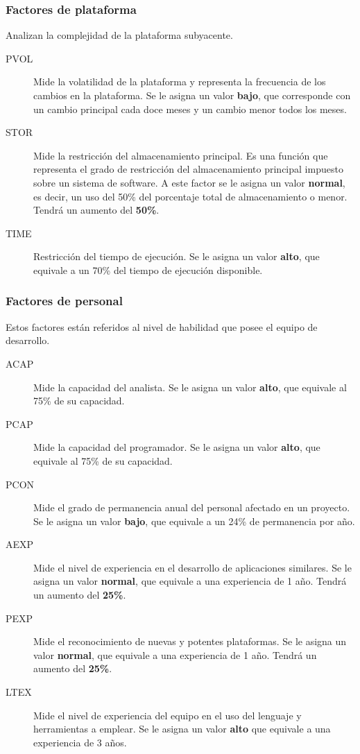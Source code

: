\documentclass[11pt,a4paper,spanish,twoside]{report}
\begin{document}
\subsubsection{Factores de plataforma}
Analizan la complejidad de la plataforma subyacente.
\begin{description}
\item[PVOL] Mide la volatilidad de la plataforma y representa la frecuencia de
  los cambios en la plataforma. Se le asigna un valor \textbf{bajo}, que
  corresponde con un cambio principal cada doce meses y un cambio menor todos
  los meses.

\item[STOR] Mide la restricción del almacenamiento principal. Es una función
  que representa el grado de restricción del almacenamiento principal
  impuesto sobre un sistema de software. A este factor se le asigna un valor
  \textbf{normal}, es decir, un uso del 50\% del porcentaje total de
  almacenamiento o menor. Tendrá un aumento del \textbf{50\%}.

\item[TIME] Restricción del tiempo de ejecución. Se le asigna un valor
  \textbf{alto}, que equivale a un 70\% del tiempo de ejecución disponible.
\end{description}

\subsubsection{Factores de personal}
Estos factores están referidos al nivel de habilidad que posee el equipo de
desarrollo.
\begin{description}
\item[ACAP] Mide la capacidad del analista. Se le asigna un valor
\textbf{alto}, que equivale al 75\% de su capacidad.
\item[PCAP] Mide la capacidad del programador. Se le asigna un valor
\textbf{alto}, que equivale al 75\% de su capacidad.
\item[PCON] Mide el grado de permanencia anual del personal afectado en un
proyecto. Se le asigna un valor \textbf{bajo}, que equivale a un 24\% de
permanencia por año.
\item[AEXP] Mide el nivel de experiencia en el desarrollo de aplicaciones
similares. Se le asigna un valor \textbf{normal}, que equivale a una
experiencia de 1 año. Tendrá un aumento del \textbf{25\%}.
\item[PEXP] Mide el reconocimiento de nuevas y potentes plataformas. Se le
asigna un valor \textbf{normal}, que equivale a una experiencia de 1
año. Tendrá un aumento del \textbf{25\%}. 
\item[LTEX] Mide el nivel de experiencia del equipo en el uso del lenguaje y
herramientas a emplear. Se le asigna un valor \textbf{alto} que equivale a una
experiencia de 3 años.
\end{description}
\end{document}
